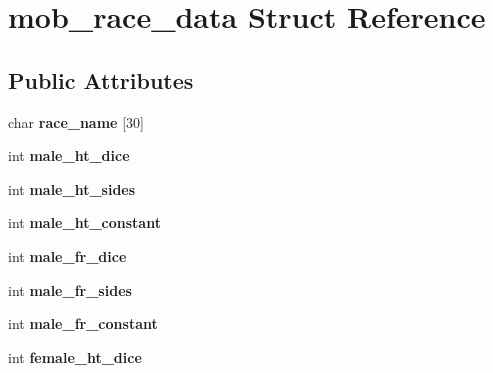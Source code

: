 \hypertarget{structmob__race__data}{\section{mob\-\_\-race\-\_\-data Struct Reference}
\label{structmob__race__data}
}
\subsection*{Public Attributes}
\begin{DoxyCompactItemize}
\item 
\hypertarget{structmob__race__data_a389ae9d25a4f59ffc2d555e3825c1112}{char {\bfseries race\-\_\-name} \mbox{[}30\mbox{]}}\label{structmob__race__data_a389ae9d25a4f59ffc2d555e3825c1112}

\item 
\hypertarget{structmob__race__data_a88171ad1cb0131ae9bbae343d269b112}{int {\bfseries male\-\_\-ht\-\_\-dice}}\label{structmob__race__data_a88171ad1cb0131ae9bbae343d269b112}

\item 
\hypertarget{structmob__race__data_a9c4eee82a50cd13b77971e8d387c9428}{int {\bfseries male\-\_\-ht\-\_\-sides}}\label{structmob__race__data_a9c4eee82a50cd13b77971e8d387c9428}

\item 
\hypertarget{structmob__race__data_a6cfd42468d5720c6b88e087ccee14bca}{int {\bfseries male\-\_\-ht\-\_\-constant}}\label{structmob__race__data_a6cfd42468d5720c6b88e087ccee14bca}

\item 
\hypertarget{structmob__race__data_a30553ff8d46edbbd89734fca88c861f1}{int {\bfseries male\-\_\-fr\-\_\-dice}}\label{structmob__race__data_a30553ff8d46edbbd89734fca88c861f1}

\item 
\hypertarget{structmob__race__data_a68e393a968e237a812efe0dc37fde044}{int {\bfseries male\-\_\-fr\-\_\-sides}}\label{structmob__race__data_a68e393a968e237a812efe0dc37fde044}

\item 
\hypertarget{structmob__race__data_a4ae41526756f801e71c7036fc85df140}{int {\bfseries male\-\_\-fr\-\_\-constant}}\label{structmob__race__data_a4ae41526756f801e71c7036fc85df140}

\item 
\hypertarget{structmob__race__data_adb01713c5978032ff72334dff4c27f13}{int {\bfseries female\-\_\-ht\-\_\-dice}}\label{structmob__race__data_adb01713c5978032ff72334dff4c27f13}


\end{DoxyCompactItemize}
